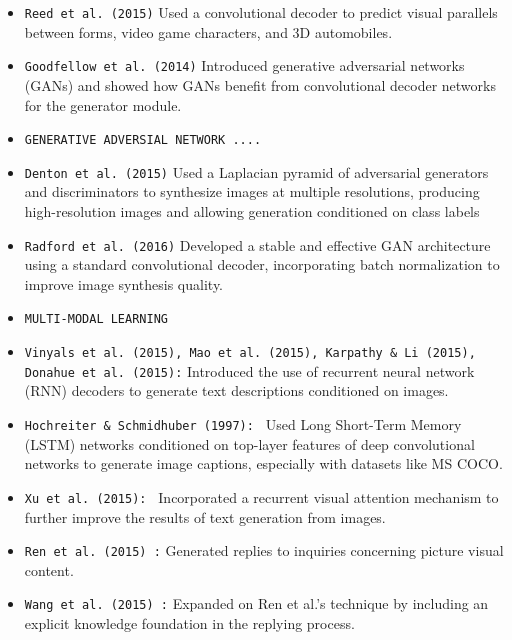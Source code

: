 \begin{itemize}[noitemsep]
    \item \texttt{Reed et al. (2015)}
    Used a convolutional decoder to predict visual parallels between forms, video game characters, and 3D automobiles.

    \item \texttt{Goodfellow et al. (2014)}
    Introduced generative adversarial networks (GANs) and showed how GANs benefit from convolutional decoder networks for the generator module.

    \item \texttt{GENERATIVE ADVERSIAL NETWORK ....}
    
    \item \texttt{Denton et al. (2015)}
    Used a Laplacian pyramid of adversarial generators and discriminators to synthesize images 
    at multiple resolutions, producing high-resolution images and allowing generation conditioned on class labels

    \item \texttt{Radford et al. (2016)}
    Developed a stable and effective GAN architecture using a standard convolutional decoder, 
    incorporating batch normalization to improve image synthesis quality.

    \item \texttt{MULTI-MODAL LEARNING  }


    \item \texttt{Vinyals et al. (2015), Mao et al. (2015), Karpathy \& Li (2015), Donahue et al. (2015):}
    Introduced the use of recurrent neural network (RNN) decoders to generate text descriptions conditioned on images.

    \item \texttt{Hochreiter \& Schmidhuber (1997): }
    Used Long Short-Term Memory (LSTM) networks conditioned on top-layer features of deep convolutional networks 
    to generate image captions, especially with datasets like MS COCO.

    \item \texttt{Xu et al. (2015): }
    Incorporated a recurrent visual attention mechanism to further improve the results of text generation from images.

    \item \texttt{Ren et al. (2015) :}
    Generated replies to inquiries concerning picture visual content.

    \item \texttt{Wang et al. (2015) :}
    Expanded on Ren et al.'s technique by including an explicit knowledge foundation in the replying process.


\end{itemize}
